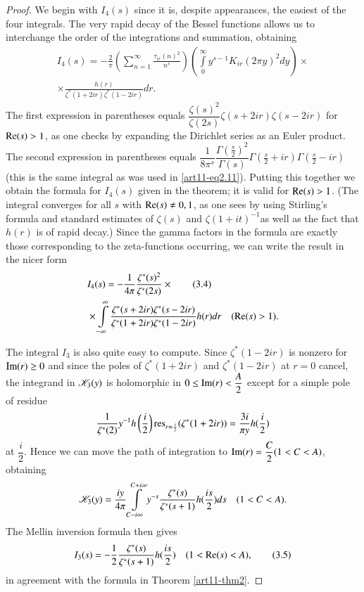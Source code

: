 \begin{proof}
We begin with $I_4 (s)$ since it is, despite appearances, the easiest of the four integrals. The very rapid decay of the Bessel functions allows us to interchange the order of the integrations and summation, obtaining 
\begin{gather*}
I_4 (s) = - \frac{2}{\pi} \left(\sum\limits^\infty_{n =1} \frac{\tau_{ir} (n)^2}{n^s} \right) \left(\int\limits^\infty_0 y^{s-1} K_{ir} (2 \pi y)^2 dy  \right) \times\\
\times \frac{h(r)}{\zeta^\ast (1+ 2ir) \zeta^\ast (1-2ir)}  dr. 
\end{gather*}
The first expression in parentheses equals $\dfrac{\zeta(s)^2}{\zeta(2s)} \zeta (s + 2ir) \zeta(s-2 ir)$ for $\operatorname{Re} (s) >1$, as one checks by expanding the Dirichlet series as an Euler product. The second expression in parentheses equals $\dfrac{1}{8 \pi^s} \dfrac{\Gamma \left(\frac{s}{2} \right)^2}{\Gamma (s)} \Gamma \left(\frac{s}{2} + ir \right) \Gamma \left(\frac{s}{2}  - ir \right)$  (this is the same integral as was used in \eqref{art11-eq2.11}). Putting this together we obtain the formula for $I_4 (s)$ given in the theorem; it is valid for $\operatorname{Re} (s) >1$. (The integral converges for all $s$ with $\operatorname{Re} (s) \neq 0, 1$, as one sees by using Stirling's formula and standard estimates of $\zeta(s)$ and $\zeta(1+it)^{-1}$\pageoriginale as well as the fact that $h(r)$ is of rapid decay.) Since the gamma factors in the formula are exactly those corresponding to the zeta-functions occurring, we can write the result in the nicer form 
\begin{align*} 
& I_4 (s)  = - \frac{1}{4 \pi} \frac{\zeta^\ast (s)^2}{\zeta^\ast (2s)} \times \tag{3.4}\label{art11-eq3.4}\\
& \times \int\limits^\infty_{-\infty} \frac{\zeta^\ast (s+2 ir) \zeta^\ast (s - 2 ir)}{\zeta^\ast (1+ 2 ir) \zeta^\ast (1-2ir)} h(r) dr \quad (\operatorname{Re} (s) >1). 
\end{align*}

The integral $I_3$ is also quite easy to compute. Since $\zeta^\ast (1 - 2 ir)$ is nonzero for $\operatorname{Im} (r)\geq 0$ and since the poles of $\zeta^\ast (1+ 2 ir)$ and $\zeta^\ast (1-2ir)$ at $r =0$ cancel, the integrand in $\mathscr{K}_3 (y)$ is holomorphic in $0 \leq \operatorname{Im} (r) < \dfrac{A}{2}$ except for a simple pole of residue 
$$
\frac{1}{\zeta^\ast (2)} y^{-1} h \left( \frac{i}{2}\right) \mathrm{res}_{r = \frac{i}{2}} (\zeta^\ast (1+ 2 ir)) = \frac{3 i}{\pi y} h (\frac{i}{2})
$$
at $\dfrac{i}{2}$. Hence we can move the path of integration to $\operatorname{Im} (r) = \dfrac{C}{2} (1 < C < A)$, obtaining 
$$
\mathscr{K}_3 (y) = \frac{iy}{4 \pi} \int\limits^{C + i \infty}_{C - i \infty}  y^{-s} \frac{\zeta^\ast(s)}{\zeta^\ast(s+1)} h (\frac{is}{2}) ds \quad (1 < C < A). 
$$
The Mellin inversion formula then gives 
\begin{equation*}
I_3 (s) = -\frac{1}{2} \frac{\zeta^\ast (s)}{\zeta^\ast (s+1)} h (\frac{is}{2}) \quad (1< \operatorname{Re} (s) < A), \tag{3.5}\label{art11-eq3.5}
\end{equation*}
in agreement with the formula in Theorem \eqref{art11-thm2}. 


\end{proof}

